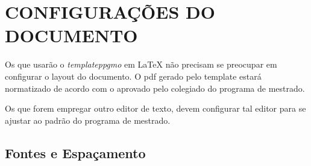 \documentclass{templateppgmo}
\numberwithin{figure}{chapter}
\numberwithin{table}{chapter}
\numberwithin{quadro}{chapter}
\numberwithin{algoritmo}{chapter}
\numberwithin{codigo}{chapter}
\begin{document}
\chapter{CONFIGURAÇÕES DO DOCUMENTO \label{capconfiguracoes}}

Os que usarão o \emph{templateppgmo} em \LaTeX{} não precisam se preocupar em configurar o layout do documento. O pdf gerado pelo template estará normatizado de acordo com o aprovado pelo colegiado do programa de mestrado.

Os que forem empregar outro editor de texto, devem configurar tal editor para se ajustar ao padrão do programa de mestrado.


\section{Fontes e Espaçamento}
\end{document}
